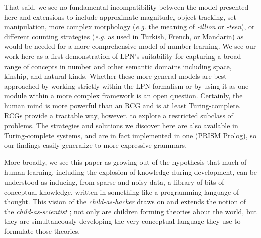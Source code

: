 \documentclass[10pt,letterpaper]{article}
\begin{document}
That said, we see no fundamental incompatibility between the model
presented here and extensions to include approximate magnitude, object
tracking, set manipulation, more complex morphology ({\it e.g.} the
meaning of \emph{-illion} or \emph{-teen}), or different counting
strategies ({\it e.g.} as used in Turkish, French, or Mandarin) as
would be needed for a more comprehensive model of number learning. We
see our work here as a first demonstration of LPN's suitability for
capturing a broad range of concepts in number and other semantic
domains including space, kinship, and natural kinds.  Whether these
more general models are best approached by working strictly within the
LPN formalism or by using it as one module within a more complex
framework is an open question. Certainly, the human mind is more
powerful than an RCG and is at least Turing-complete.  RCGs provide a
tractable way, however, to explore a restricted subclass of
problems. The strategies and solutions we discover here are also
available in Turing-complete systems, and are in fact implemented in
one (PRISM Prolog), so our findings easily generalize to more
expressive grammars.

More broadly, we see this paper as growing out of the hypothesis that
much of human learning, including the explosion of knowledge during
development, can be understood as inducing, from sparse and noisy data,
a library of bits of conceptual knowledge, written in something like a
programming language of thought. This vision of the
\emph{child-as-hacker} draws on and extends the notion of the
\emph{child-as-scientist} \citep{gopnik1996scientist}; not only are
children forming theories about the world, but they are simultaneously
developing the very conceptual language they use to formulate those
theories.





\setlength{\bibleftmargin}{.125in}
\setlength{\bibindent}{-\bibleftmargin}

\end{document}

